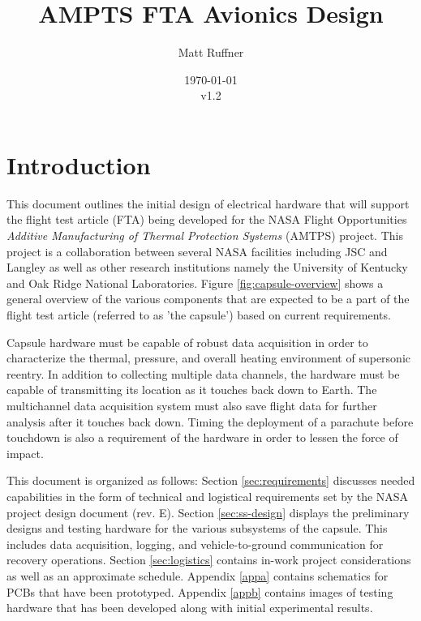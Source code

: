\documentclass{article}
\title{AMPTS FTA Avionics Design}
\author{Matt Ruffner}
\date{\today\\v1.2}
\newcommand{\ddrev}{E}
\begin{document}
\maketitle
\begin{center}
\end{center}
\tableofcontents \newpage
\listoffigures 
\listoftables \newpage



\section{Introduction}
This document outlines the initial design of electrical hardware that will support the flight test article (FTA) being developed for the NASA Flight Opportunities \textit{Additive Manufacturing of Thermal Protection Systems} (AMTPS) project. This project is a collaboration between several NASA facilities including JSC and Langley as well as other research institutions namely the University of Kentucky and Oak Ridge National Laboratories. Figure \ref{fig:capsule-overview} shows a general overview of the various components that are  expected to be a part of the flight test article (referred to as 'the capsule') based on current requirements.

Capsule hardware must be capable of robust data acquisition in order to characterize the thermal, pressure, and overall heating environment of supersonic reentry. In addition to collecting multiple data channels, the hardware must be capable of transmitting its location as it touches back down to Earth. The multichannel data acquisition system must also save flight data for further analysis after it touches back down. Timing the deployment of a parachute before touchdown is also a requirement of the hardware in order to lessen the force of impact.

This document is organized as follows: Section \ref{sec:requirements} discusses needed capabilities in the form of technical and logistical requirements set by the NASA project design document (rev. \ddrev ). Section \ref{sec:ss-design} displays the preliminary designs and testing hardware for the various subsystems of the capsule. This includes data acquisition, logging, and vehicle-to-ground communication for recovery operations. Section \ref{sec:logistics} contains in-work project considerations as well as an approximate schedule. Appendix \ref{appa} contains schematics for PCBs that have been prototyped. Appendix \ref{appb} contains images of testing hardware that has been developed along with initial experimental results. 
\end{document}
